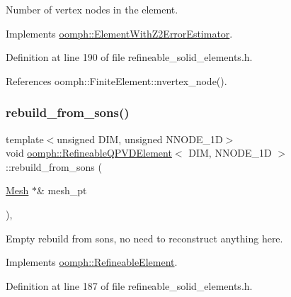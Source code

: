 Number of vertex nodes in the element. 



Implements \hyperlink{classoomph_1_1ElementWithZ2ErrorEstimator_a19495a0e77ef4ff35f15fdf7913b4077}{oomph\+::\+Element\+With\+Z2\+Error\+Estimator}.



Definition at line 190 of file refineable\+\_\+solid\+\_\+elements.\+h.



References oomph\+::\+Finite\+Element\+::nvertex\+\_\+node().

\mbox{\label{classoomph_1_1RefineableQPVDElement_abf45607aefbc031ce918757010564d26}} 
\subsubsection{\texorpdfstring{rebuild\+\_\+from\+\_\+sons()}{rebuild\_from\_sons()}}
{\footnotesize\ttfamily template$<$unsigned D\+IM, unsigned N\+N\+O\+D\+E\+\_\+1D$>$ \\
void \hyperlink{classoomph_1_1RefineableQPVDElement}{oomph\+::\+Refineable\+Q\+P\+V\+D\+Element}$<$ D\+IM, N\+N\+O\+D\+E\+\_\+1D $>$\+::rebuild\+\_\+from\+\_\+sons (\begin{DoxyParamCaption}\item[{\hyperlink{classoomph_1_1Mesh}{Mesh} $\ast$\&}]{mesh\+\_\+pt }\end{DoxyParamCaption})\hspace{0.3cm}{\ttfamily [inline]}, {\ttfamily [virtual]}}



Empty rebuild from sons, no need to reconstruct anything here. 



Implements \hyperlink{classoomph_1_1RefineableElement_a33324be27833fa4b78279d17158215fa}{oomph\+::\+Refineable\+Element}.



Definition at line 187 of file refineable\+\_\+solid\+\_\+elements.\+h.

\mbox{\label{classoomph_1_1RefineableQPVDElement_a38b27b036fb60bb46250de484ca54cae}} 
